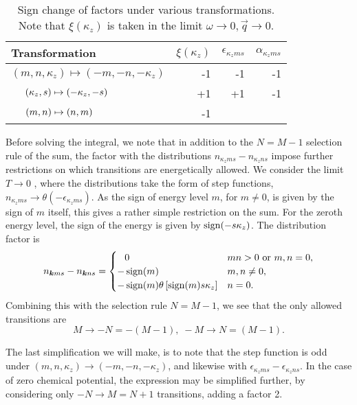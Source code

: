 \begin{table}[ht]
  \centering
  \begin{tabular}{l r r r}
    \toprule
    Transformation & \( \xi(\kappa_z) \) & \( \epsilon_{\kappa_z m s} \) & \( \alpha_{\kappa_z m s} \)\\
    \midrule
    \( (m, n, \kappa_z) \mapsto (-m, -n, -\kappa_z) \) & -1 & -1 & -1\\
    \( \hphantom{(m, n, \kappa_z)}\mathllap{(\kappa_z, s)} \mapsto (-\kappa_z, -s) \) & +1 & +1 & -1\\
    \(  \hphantom{(m, n, \kappa_z)}\mathllap{ (m, n)} \mapsto (n, m)\) & -1 &&\\
    \bottomrule
  \end{tabular}
  \caption{Sign change of factors under various transformations. Note that \( \xi(\kappa_z) \) is taken in the limit \( \omega\to0, \vec{q}\to 0 \). \label{tab:transform-sign}}
\end{table}

Before solving the integral, we note that in addition to the  \( N=M-1 \) selection rule of the sum, the factor with the distributions \( n_{\kappa_z m s} - n_{\kappa_z n s} \) impose further restrictions on which transitions are energetically allowed.
We consider the limit \( T \to 0 \) , where the distributions take the form of step functions, \( n_{\kappa_z m s} \to \theta(-\epsilon_{\kappa_z m s}) \).
As the sign of energy level \( m \), for \( m \neq 0 \), is given by the sign of \( m \) itself, this gives a rather simple restriction on the sum.
For the zeroth energy level, the sign of the energy is given by \( \operatorname{sign}(-s\kappa_z) \).
The distribution factor is
\begin{equation}
  \label{eq:92}
  n_{\bm{k} m s} - n_{\bm{k} n s} =
  \begin{cases}
    \phantom{-} 0 & m n > 0 \text{ or  } m,n = 0,\\
    - \operatorname{sign}(m) & m,n \neq 0,\\
    -\operatorname{sign}(m) \theta\left[\operatorname{sign}(m) s \kappa_z\right] & n = 0.
  \end{cases}
\end{equation}
Combining this with the selection rule \( N=M-1 \), we see that the only allowed transitions are
\[ M \to -N = -(M-1), \; -M \to N = (M-1). \]

The last simplification we will make, is to note that the step function is odd under \( (m, n, \kappa_z) \to (-m, -n, -\kappa_z) \), and likewise with \( \epsilon_{\kappa_z m s} - \epsilon_{\kappa_z n s} \).
In the case of zero chemical potential, the expression may be simplified further, by considering only \( -N \to M = N + 1\) transitions, adding a factor 2.

